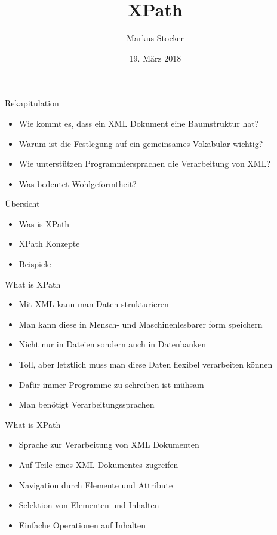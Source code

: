 \documentclass{beamer}
\title{XPath}
\author{Markus Stocker}
\date{19. März 2018}
\begin{document}
\maketitle

\begin{frame}{Rekapitulation}
	
	\begin{itemize}
		\item Wie kommt es, dass ein XML Dokument eine Baumstruktur hat?
		\item Warum ist die Festlegung auf ein gemeinsames Vokabular wichtig?
		\item Wie unterstützen Programmiersprachen die Verarbeitung von XML?
		\item Was bedeutet Wohlgeformtheit?
	\end{itemize}
	
\end{frame}

\begin{frame}{Übersicht}
	
	\begin{itemize}
		\item Was is XPath
		\item XPath Konzepte
		\item Beispiele
	\end{itemize}
	
\end{frame}

\begin{frame}{What is XPath}
	
	\begin{itemize}
		\item Mit XML kann man Daten strukturieren
		\item Man kann diese in Mensch- und Maschinenlesbarer form speichern
		\item Nicht nur in Dateien sondern auch in Datenbanken
		\item Toll, aber letztlich muss man diese Daten flexibel verarbeiten können
		\item Dafür immer Programme zu schreiben ist mühsam
		\item Man benötigt Verarbeitungssprachen
	\end{itemize}
	
\end{frame}

\begin{frame}{What is XPath}
	
	\begin{itemize}
		\item Sprache zur Verarbeitung von XML Dokumenten
		\item Auf Teile eines XML Dokumentes zugreifen
		\item Navigation durch Elemente und Attribute
		\item Selektion von Elementen und Inhalten
		\item Einfache Operationen auf Inhalten
	\end{itemize}
	
\end{frame}
\end{document}
